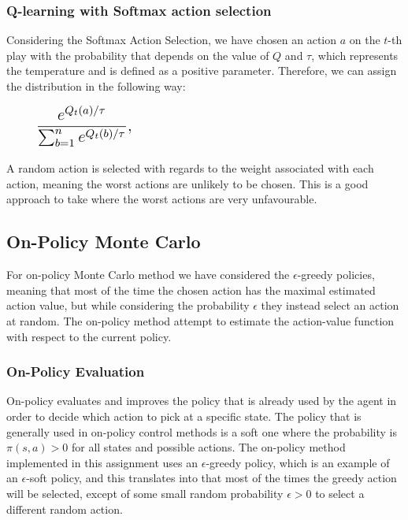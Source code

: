 \documentclass[paper=a4, fontsize=11pt]{scrartcl}
\numberwithin{equation}{section}		%
\numberwithin{figure}{section}			%
\numberwithin{table}{section}				%
\begin{document}
\subsubsection*{Q-learning with Softmax action selection}
Considering the Softmax Action Selection,  we have chosen an action $a$ on the $t$-th play with the probability that depends on the value of $Q$ and $\tau$, which represents the temperature and is defined as a positive parameter. Therefore, we can assign the distribution in the following way:
\begin{figure}[H] \centering
\includegraphics[scale=0.6]{numeqtmp1.png}
\end{figure}
A random action is selected with regards to the weight associated with each action, meaning the worst actions are unlikely to be chosen. This is a good approach to take where the worst actions are very unfavourable.\\


\subsection{\textbf {On-Policy Monte Carlo}}
For on-policy Monte Carlo method we have considered the $\epsilon$-greedy policies, meaning that most of the time the chosen action has the maximal estimated action value, but while considering the probability $\epsilon$ they instead select an action at random. The on-policy method attempt  to estimate the action-value function with respect to the current policy.

\subsubsection*{On-Policy Evaluation}
On-policy evaluates and improves the policy that is already used by the agent in order to decide which action to pick at a specific state. The policy that is generally used in on-policy control methods is a soft one where the probability is $\pi(s,a) > 0$ for all states and possible actions. The on-policy method implemented in this assignment uses an $\epsilon$-greedy policy, which is an example of an $\epsilon$-soft policy, and this translates into that most of the times the greedy action will be selected, except of some small random probability $\epsilon > 0$ to select a different random action.
\end{document}
